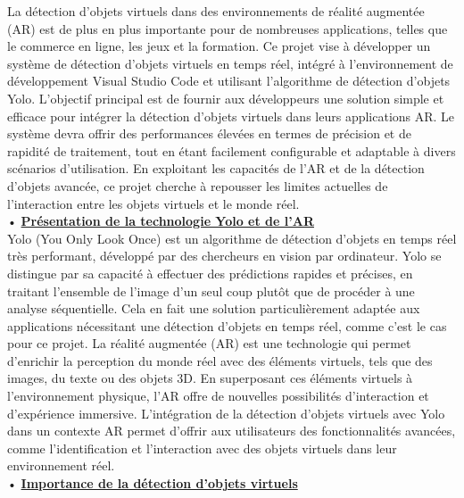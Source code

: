 \documentclass[a4paper, 13px]{article}
\begin{document}
La détection d'objets virtuels dans des environnements de réalité augmentée (AR) est de plus en plus importante pour de nombreuses applications, telles que le commerce en ligne, les jeux et la formation. Ce projet vise à développer un système de détection d'objets virtuels en temps réel, intégré à l'environnement de développement Visual Studio Code et utilisant l'algorithme de détection d'objets Yolo. L'objectif principal est de fournir aux développeurs une solution simple et efficace pour intégrer la détection d'objets virtuels dans leurs applications AR. Le système devra offrir des performances élevées en termes de précision et de rapidité de traitement, tout en étant facilement configurable et adaptable à divers scénarios d'utilisation. En exploitant les capacités de l'AR et de la détection d'objets avancée, ce projet cherche à repousser les limites actuelles de l'interaction entre les objets virtuels et le monde réel.\\

•	{\bfseries \underline{Présentation de la technologie Yolo et de l'AR}}\\

Yolo (You Only Look Once) est un algorithme de détection d'objets en temps réel très performant, développé par des chercheurs en vision par ordinateur. Yolo se distingue par sa capacité à effectuer des prédictions rapides et précises, en traitant l'ensemble de l'image d'un seul coup plutôt que de procéder à une analyse séquentielle. Cela en fait une solution particulièrement adaptée aux applications nécessitant une détection d'objets en temps réel, comme c'est le cas pour ce projet.
La réalité augmentée (AR) est une technologie qui permet d'enrichir la perception du monde réel avec des éléments virtuels, tels que des images, du texte ou des objets 3D. En superposant ces éléments virtuels à l'environnement physique, l'AR offre de nouvelles possibilités d'interaction et d'expérience immersive. L'intégration de la détection d'objets virtuels avec Yolo dans un contexte AR permet d'offrir aux utilisateurs des fonctionnalités avancées, comme l'identification et l'interaction avec des objets virtuels dans leur environnement réel.\\

•	{\bfseries \underline{Importance de la détection d'objets virtuels}}\\
\end{document}
